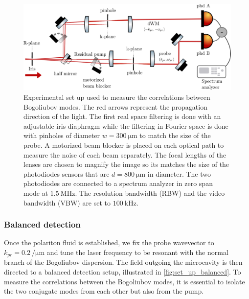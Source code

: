 \begin{figure}
    \centering
    \includegraphics[width=1\textwidth]{chap_correlation/fig/half_mirror.pdf}
    \caption{Experimental set up used to measure the correlations between Bogoliubov modes. The red arrows represent the propagation direction of the light.
    The first real space filtering is done with an adjustable iris diaphragm while the filtering in Fourier space is done with pinholes of diameter $w=\SI{300}{\micro\meter}$ to match the size of the 
    probe. A motorized beam blocker is placed on each optical path to measure the noise of each beam separately. The focal lengths of the lenses are chosen to magnify the image so its matches the size of the photodiodes sensors that are $d=\SI{800}{\micro\meter}$ in diameter. The two photodiodes are connected to a spectrum analyzer in zero span mode at $\SI{1.5}{\mega\hertz}$. The resolution bandwidth (RBW) and the video bandwidth (VBW) are set to $\SI{100}{\kilo\hertz}$.}
    \label{fig:set_up_balanced}
\end{figure}

\subsubsection{Balanced detection}
Once the polariton fluid is established, we fix the probe wavevector to $k_{pr}=\SI{0.2}{\per\micro\meter}$ and tune the laser frequency to be resonant with the normal branch of the Bogoliubov dispersion. The field outgoing the microcavity is then directed to a balanced detection setup, illustrated in \autoref{fig:set_up_balanced}.
To measure the correlations between the Bogoliubov modes, it is essential to isolate the two conjugate modes from each other but also from the pump. 

\bigskip

